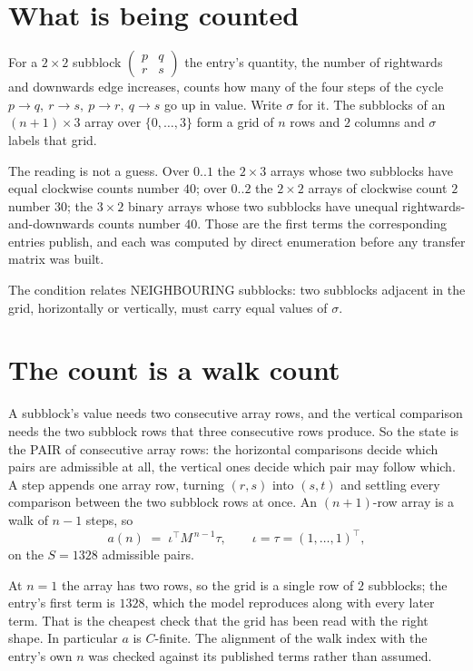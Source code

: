 \documentclass[11pt,a4paper]{article}
\theoremstyle{plain}
\theoremstyle{definition}
\begin{document}
\section{What is being counted}

For a $2\times2$ subblock $\begin{pmatrix}p&q\\r&s\end{pmatrix}$ the
entry's quantity, the number of rightwards and downwards edge increases, counts how many of the four steps of the cycle $p\to q,\ r\to s,\ p\to r,\ q\to s$ go up in value. Write $\sigma$ for it. The subblocks of an
$(n+1)\times3$ array over $\{0,\dots,3\}$ form a grid of $n$ rows and $2$
columns and $\sigma$ labels that grid.

The reading is not a guess. Over $0..1$ the $2\times3$ arrays whose two subblocks have equal
clockwise counts number $40$; over $0..2$ the $2\times2$ arrays of clockwise count $2$ number
$30$; the $3\times2$ binary arrays whose two subblocks have unequal rightwards-and-downwards
counts number $40$. Those are the first terms the corresponding entries publish, and each was
computed by direct enumeration before any transfer matrix was built.

The condition relates NEIGHBOURING subblocks: two subblocks adjacent in the grid, horizontally
or vertically, must carry equal values of $\sigma$.

\section{The count is a walk count}

A subblock's value needs two consecutive array rows, and the vertical
comparison needs the two subblock rows that three consecutive rows produce. So the state is the
PAIR of consecutive array rows: the horizontal comparisons decide which pairs are admissible at
all, the vertical ones decide which pair may follow which. A step appends one array row,
turning $(r,s)$ into $(s,t)$ and settling every comparison between the two subblock rows at
once. An $(n+1)$-row array is a walk of $n-1$ steps, so
\[
a(n)\;=\;\iota^{\!\top}M^{\,n-1}\tau,\qquad\iota=\tau=(1,\dots,1)^{\!\top},
\]
on the $S=1328$ admissible pairs.

At $n=1$ the array has two rows, so the grid is a single row of $2$
subblocks; the entry's first term is $1328$, which the model
reproduces along with every later term. That is the cheapest check that the grid has been read
with the right shape.
In particular $a$ is $C$-finite. The alignment of the walk index with the entry's own $n$ was
checked against its published terms rather than assumed.
\end{document}
